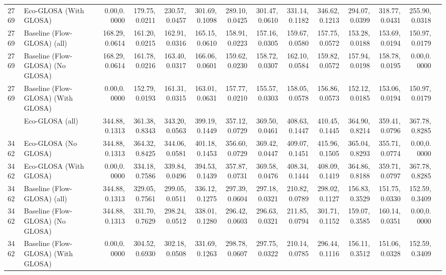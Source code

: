 \begin{table}[ht]
{\begin{tabular}{llrrrrrrrrrrrr}
        2769 & Eco-GLOSA (With GLOSA)             & 0.00,0.0000   & 179.75,0.0211 & 230.57,0.0457 & 301.69,0.1098 & 289.10,0.0425 & 301.47,0.0610 & 331.14,0.1182 & 346.62,0.1213 & 294.07,0.0399 & 318.77,0.0431 & 255.90,0.0318 \\
        2769 & Baseline (Flow-GLOSA) (all)        & 168.29,0.0614 & 161.20,0.0215 & 162.91,0.0316 & 165.15,0.0610 & 158.91,0.0223 & 157.16,0.0305 & 159.67,0.0580 & 157.75,0.0572 & 153.28,0.0188 & 153.69,0.0194 & 150.97,0.0179 \\
        2769 & Baseline (Flow-GLOSA) (No GLOSA)   & 168.29,0.0614 & 161.78,0.0216 & 163.40,0.0317 & 166.06,0.0601 & 159.62,0.0230 & 158.72,0.0307 & 162.10,0.0584 & 159.82,0.0572 & 157.94,0.0198 & 158.78,0.0195 & 0.00,0.0000   \\
        2769 & Baseline (Flow-GLOSA) (With GLOSA) & 0.00,0.0000   & 152.79,0.0193 & 161.31,0.0315 & 163.01,0.0631 & 157.77,0.0210 & 155.57,0.0303 & 158.05,0.0578 & 156.86,0.0573 & 152.12,0.0185 & 153.06,0.0194 & 150.97,0.0179 \\
        \addlinespace
        3462 & Eco-GLOSA (all)                    & 344.88,0.1313 & 361.38,0.8343 & 343.20,0.0563 & 399.19,0.1449 & 357.12,0.0729 & 369.50,0.0461 & 408.63,0.1447 & 410.45,0.1445 & 364.90,0.8214 & 359.41,0.0796 & 367.78,0.8285 \\
        3462 & Eco-GLOSA (No GLOSA)               & 344.88,0.1313 & 364.32,0.8425 & 344.06,0.0581 & 401.18,0.1453 & 356.60,0.0729 & 369.42,0.0447 & 409.07,0.1451 & 415.96,0.1505 & 365.04,0.8293 & 355.71,0.0774 & 0.00,0.0000   \\
        3462 & Eco-GLOSA (With GLOSA)             & 0.00,0.0000   & 334.18,0.7586 & 339.84,0.0496 & 394.53,0.1439 & 357.87,0.0731 & 369.58,0.0476 & 408.34,0.1444 & 408.09,0.1419 & 364.86,0.8188 & 359.71,0.0797 & 367.78,0.8285 \\
        3462 & Baseline (Flow-GLOSA) (all)        & 344.88,0.1313 & 329.05,0.7561 & 299.05,0.0511 & 336.12,0.1275 & 297.39,0.0604 & 297.18,0.0321 & 210.82,0.0789 & 298.02,0.1127 & 156.83,0.3529 & 151.75,0.0330 & 152.59,0.3409 \\
        3462 & Baseline (Flow-GLOSA) (No GLOSA)   & 344.88,0.1313 & 331.70,0.7629 & 298.24,0.0512 & 338.01,0.1280 & 296.42,0.0603 & 296.63,0.0321 & 211.85,0.0794 & 301.71,0.1152 & 159.07,0.3585 & 160.14,0.0351 & 0.00,0.0000   \\
        3462 & Baseline (Flow-GLOSA) (With GLOSA) & 0.00,0.0000   & 304.52,0.6930 & 302.18,0.0508 & 331.69,0.1263 & 298.78,0.0607 & 297.75,0.0322 & 210.14,0.0785 & 296.44,0.1116 & 156.11,0.3512 & 151.06,0.0328 & 152.59,0.3409 \\
        \bottomrule
      \end{tabular}
    }
\end{table}


